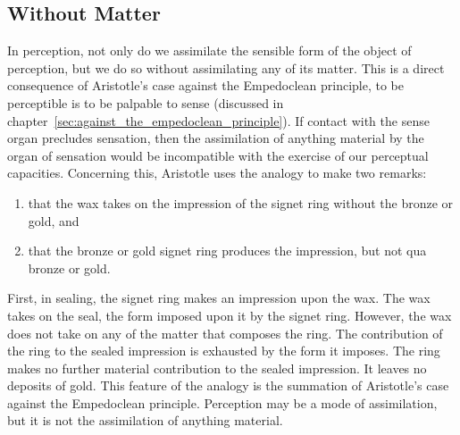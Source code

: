 
\subsection{Without Matter} %
\label{sub:without_matter}

In perception, not only do we assimilate the sensible form of the object of perception, but we do so without assimilating any of its matter. This is a direct consequence of Aristotle's case against the Empedoclean principle, to be perceptible is to be palpable to sense (discussed in chapter~\ref{sec:against_the_empedoclean_principle}). If contact with the sense organ precludes sensation, then the assimilation of anything material by the organ of sensation would be incompatible with the exercise of our perceptual capacities. Concerning this, Aristotle uses the analogy to make two remarks:
\begin{enumerate}[(1)]
	\item that the wax takes on the impression of the signet ring without the bronze or gold, and
	\item that the bronze or gold signet ring produces the impression, but not qua bronze or gold.
\end{enumerate}

First, in sealing, the signet ring makes an impression upon the wax. The wax takes on the seal, the form imposed upon it by the signet ring. However, the wax does not take on any of the matter that composes the ring.  The contribution of the ring to the sealed impression is exhausted by the form it imposes. The ring makes no further material contribution to the sealed impression. It leaves no deposits of gold. This feature of the analogy is the summation of Aristotle's case against the Empedoclean principle. Perception may be a mode of assimilation, but it is not the assimilation of anything material.

